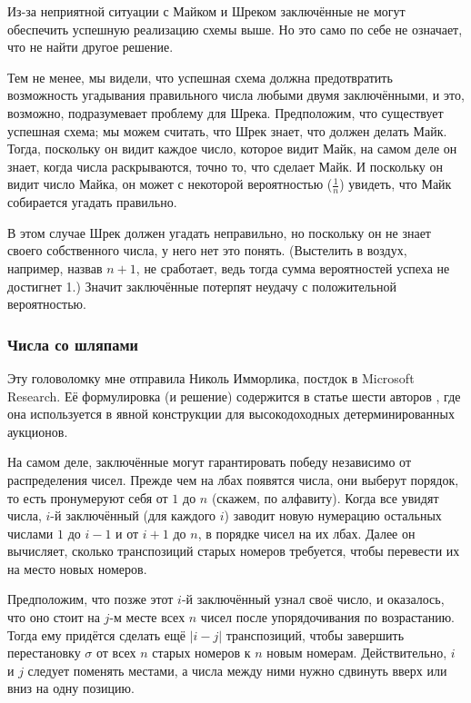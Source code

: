 Из-за неприятной ситуации с Майком и Шреком заключённые не могут обеспечить успешную реализацию схемы выше. Но это само по себе не означает, что не найти другое решение.

Тем не менее, мы видели, что успешная схема должна предотвратить возможность угадывания правильного числа любыми двумя заключёнными, и это, возможно, подразумевает проблему для Шрека. Предположим, что существует успешная схема; мы можем считать, что Шрек знает, что должен делать Майк. Тогда, поскольку он видит каждое число, которое видит Майк, на самом деле он знает, когда числа раскрываются, точно то, что сделает Майк. И поскольку он видит число Майка, он может с некоторой вероятностью ($\tfrac1n$) увидеть, что Майк собирается угадать правильно.

В этом случае Шрек должен угадать неправильно, но поскольку он не знает своего собственного числа, у него нет это понять.
(Выстелить в воздух, например, назвав $n + 1$, не сработает, ведь тогда сумма вероятностей успеха не достигнет 1.)
Значит заключённые потерпят неудачу с положительной вероятностью.

\subsubsection*{Числа со шляпами}

Эту головоломку мне отправила Николь Имморлика, постдок в Microsoft Research. Её формулировка (и решение) содержится в статье шести авторов \cite{1}, где она используется в явной конструкции для высокодоходных детерминированных аукционов.

На самом деле, заключённые могут гарантировать победу независимо от распределения чисел.
Прежде чем на лбах появятся числа, они выберут порядок, то есть пронумеруют себя от $1$ до $n$ (скажем, по алфавиту).
Когда все увидят числа, $i$-й заключённый (для каждого $i$) заводит новую нумерацию остальных числами $1$ до $i - 1$ и от $i + 1$ до $n$, в порядке чисел на их лбах.
Далее он вычисляет, сколько транспозиций старых номеров требуется, чтобы перевести их на место новых номеров.

Предположим, что позже этот $i$-й заключённый узнал своё число, и оказалось, что оно стоит на $j$-м месте всех $n$ чисел после упорядочивания по возрастанию.
Тогда ему придётся сделать ещё $|i - j|$ транспозиций, чтобы завершить перестановку $\sigma$ от всех $n$ старых номеров к $n$ новым номерам.
Действительно, $i$ и $j$ следует поменять местами, а числа между ними нужно сдвинуть вверх или вниз на одну позицию.


